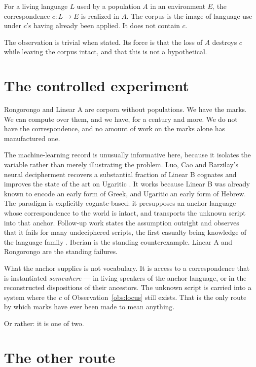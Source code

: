 \begin{observation}
\label{obs:locus}
For a living language $L$ used by a population $A$ in an
environment $E$, the correspondence $c : L \to E$ is realized in
$A$.
The corpus is the image of language use under $c$'s having already
been applied.
It does not contain $c$.
\end{observation}

\noindent
The observation is trivial when stated.
Its force is that the loss of $A$ destroys $c$ while leaving the
corpus intact, and that this is not a hypothetical.

\section{The controlled experiment}
\label{sec:decipherment}

Rongorongo and Linear A are corpora without populations.
We have the marks.
We can compute over them, and we have, for a century and more.
We do not have the correspondence, and no amount of work on the
marks alone has manufactured one.

The machine-learning record is unusually informative here, because
it isolates the variable rather than merely illustrating the
problem.
Luo, Cao and Barzilay's neural decipherment recovers a substantial
fraction of Linear B cognates and improves the state of the art on
Ugaritic \cite{luo2019}.
It works because Linear B was already known to encode an early form
of Greek, and Ugaritic an early form of Hebrew.
The paradigm is explicitly cognate-based: it presupposes an anchor
language whose correspondence to the world is intact, and
transports the unknown script into that anchor.
Follow-up work states the assumption outright and observes that it
fails for many undeciphered scripts, the first casualty being
knowledge of the language family \cite{luo2021}.
Iberian is the standing counterexample.
Linear A and Rongorongo are the standing failures.

What the anchor supplies is not vocabulary.
It is access to a correspondence that is instantiated
\emph{somewhere} --- in living speakers of the anchor language, or
in the reconstructed dispositions of their ancestors.
The unknown script is carried into a system where the $c$ of
Observation~\ref{obs:locus} still exists.
That is the only route by which marks have ever been made to mean
anything.

Or rather: it is one of two.

\section{The other route}
\label{sec:whales}

